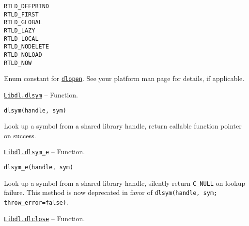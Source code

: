 \begin{adjustwidth}{2em}{0pt}


\begin{verbatim}
RTLD_DEEPBIND
RTLD_FIRST
RTLD_GLOBAL
RTLD_LAZY
RTLD_LOCAL
RTLD_NODELETE
RTLD_NOLOAD
RTLD_NOW
\end{verbatim}

Enum constant for \hyperlink{8171750449393676854}{\texttt{dlopen}}. See your platform man page for details, if applicable.



\end{adjustwidth}
\hypertarget{13057188112538777408}{} 
\hyperlink{13057188112538777408}{\texttt{Libdl.dlsym}}  -- {Function.}

\begin{adjustwidth}{2em}{0pt}


\begin{verbatim}
dlsym(handle, sym)
\end{verbatim}

Look up a symbol from a shared library handle, return callable function pointer on success.



\end{adjustwidth}
\hypertarget{10957545335350379951}{} 
\hyperlink{10957545335350379951}{\texttt{Libdl.dlsym\_e}}  -- {Function.}

\begin{adjustwidth}{2em}{0pt}


\begin{verbatim}
dlsym_e(handle, sym)
\end{verbatim}

Look up a symbol from a shared library handle, silently return \texttt{C\_NULL} on lookup failure. This method is now deprecated in favor of \texttt{dlsym(handle, sym; throw\_error=false)}.



\end{adjustwidth}
\hypertarget{6068064281708498692}{} 
\hyperlink{6068064281708498692}{\texttt{Libdl.dlclose}}  -- {Function.}

